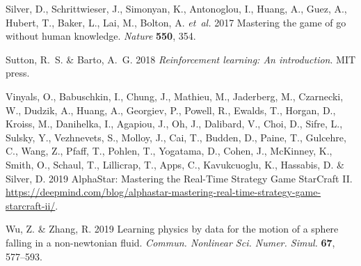 \documentclass{article}
\begin{document}
\begin{thebibliography}{30}
{\sc Silver, D., Schrittwieser, J., Simonyan, K., Antonoglou, I., Huang, A.,
  Guez, A., Hubert, T., Baker, L., Lai, M., Bolton, A. {\em et~al.\/}} 2017
  Mastering the game of go without human knowledge. {\em Nature\/} {\bf
  550}, 354.

{\sc Sutton, R.~S. \& Barto, A.~G.} 2018 {\em Reinforcement learning: An
  introduction\/}. MIT press.

{\sc Vinyals, O., Babuschkin, I., Chung, J., Mathieu, M., Jaderberg, M.,
  Czarnecki, W., Dudzik, A., Huang, A., Georgiev, P., Powell, R., Ewalds, T.,
  Horgan, D., Kroiss, M., Danihelka, I., Agapiou, J., Oh, J., Dalibard, V.,
  Choi, D., Sifre, L., Sulsky, Y., Vezhnevets, S., Molloy, J., Cai, T., Budden,
  D., Paine, T., Gulcehre, C., Wang, Z., Pfaff, T., Pohlen, T., Yogatama, D.,
  Cohen, J., McKinney, K., Smith, O., Schaul, T., Lillicrap, T., Apps, C.,
  Kavukcuoglu, K., Hassabis, D. \& Silver, D.} 2019 {AlphaStar: Mastering the
  Real-Time Strategy Game StarCraft II}.
  \url{https://deepmind.com/blog/alphastar-mastering-real-time-strategy-game-starcraft-ii/}.

{\sc Wu, Z. \& Zhang, R.} 2019 Learning physics by data for the motion of a
  sphere falling in a non-newtonian fluid. {\em Commun. Nonlinear Sci. Numer. Simul.\/} {\bf 67}, 577--593.

\end{thebibliography}
\end{document}

